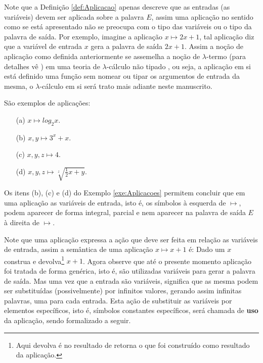 Note que a Definição \ref{def:Aplicacao} apenas descreve que as entradas (as variáveis) devem ser aplicada sobre a palavra $E$, assim uma aplicação no sentido como se está apresentado não se preocupa com o tipo das variáveis ou o tipo da palavra de saída. Por exemplo, imagine a aplicação $x \mapsto 2x + 1$, tal aplicação diz que a variável de entrada $x$ gera a palavra de saída $2x + 1$. Assim a noção de aplicação como definida anteriormente se assemelha a noção de $\lambda$-termo (para detalhes vê \cite{bare1984, bimbo2019, hankin2004}) em uma teoria de $\lambda$-cálculo não tipado \cite{henk1992, hankin2004}, ou seja, a aplicação em si está definido uma função sem nomear ou tipar os argumentos de entrada da mesma, o $\lambda$-cálculo em si será trato mais adiante neste manuscrito.

\begin{example}\label{exe:Aplicacoes}
	São exemplos de aplicações:
	\begin{itemize}
		\item[(a)] $x \mapsto log_2 x$.
		\item[(b)] $x, y \mapsto 3^x + x$.
		\item[(c)] $x, y, z \mapsto 4$.
		\item[(d)] $x, y, z \mapsto \sqrt[z]{\frac{1}{2}x + y}$.
	\end{itemize}
\end{example}

\begin{remark}
	Os itens (b), (c) e (d) do Exemplo \ref{exe:Aplicacoes} permitem concluir que em uma aplicação as variáveis de entrada, isto é, os símbolos à esquerda de $\mapsto$, podem aparecer de forma integral, parcial e nem aparecer na palavra de saída $E$ à direita de $\mapsto$.    
\end{remark}

Note que uma aplicação expressa a ação que deve ser feita em relação as variáveis de entrada, assim a semântica de uma aplicação  $x \mapsto x + 1$ é: Dado um $x$ construa e devolva\footnote{Aqui devolva é no resultado de retorna o que foi construído como resultado da aplicação.} $x + 1$. Agora observe que até o presente momento aplicação foi tratada de forma genérica, isto é, são utilizadas variáveis para gerar a palavra de saída. Mas uma vez que a entrada são variáveis, significa que as mesma podem ser substituídas (possivelmente) por infinitos valores, gerando assim infinitas palavras, uma para cada entrada. Esta ação de substituir as variáveis por elementos específicos, isto é, símbolos constantes específicos, será chamada de \textbf{uso} da aplicação, sendo formalizado a seguir.

